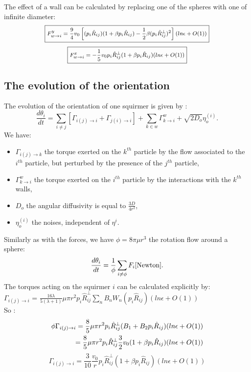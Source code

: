 \documentclass{article}
\begin{document}
The effect of a wall can be calculated by replacing one of the spheres with one of infinite diameter:
\begin{equation*}
    \footnotesize
    \boxed{F_{w\rightarrow i}^{y} = \frac{9}{4} v_0
    \left[(p_i\hat{R}_{ij})(1 + \beta p_i\hat{R}_{ij}) - \frac{1}{2}\beta(p_i\hat{R}^{\perp}_{ij})^2\right](ln \epsilon + O(1))}\\
\end{equation*}
\begin{equation*}
    \footnotesize
    \boxed{F_{w\rightarrow i}^{x} = -\frac{1}{5} v_0p_i\hat{R}^{\perp}_{ij}(1 + \beta p_i\hat{R}_{ij})(ln \epsilon + O(1))}
\end{equation*}

\subsection{The evolution of the orientation}
The evolution of the orientation of one squirmer is given by : 
$$
\boxed{\frac{d \theta_i}{dt} = \sum\limits_{i\ne j} \left[\Gamma_{i(j)\rightarrow i} + \Gamma_{j(i)\rightarrow i}\right] + \sum\limits_{k\in w} \Gamma_{k\rightarrow i}^w + \sqrt{2D_o} \eta_o^{(i)}}.
$$
We have:
\begin{itemize}
    \item $\Gamma_{i(j)\rightarrow k}$ the torque exerted on the $k^{th}$ particle by the flow associated to the $i^{th}$ particle, but perturbed by the presence of the $j^{th}$ particle,
    \item $\Gamma_{k\rightarrow i}^w$ the torque exerted on the $i^{th}$ particle by the interactions with the $k^{th}$ walls,
    \item $D_o$ the angular diffusivity is equal to $\frac{3D}{4r^2}$,
    \item $\eta_o^{(i)}$ the noises, independent of $\eta^{i}$.
\end{itemize}
\vspace{0.5cm}
Similarly as with the forces, we have $\phi = 8\pi\mu r^3$ the rotation flow around a sphere\cite{Stokes}:
$$\frac{d \theta_i}{dt} = \frac{1}{\phi}\sum\limits_{i \ne \phi}F_i\cite{Newton}.$$
The torques acting on the squirmer $i$ can be calculated explicitly by: \\
$\Gamma_{i(j)\rightarrow i}$ = $\frac{16 \lambda}{5(\lambda +1)} \mu \pi r^2 p_i\hat{R}_{ij}^{\perp}\sum_{n} B_n W_n(p_i\hat{R}_{ij}) (ln \epsilon + O(1))$ \cite{Brumley}
\\ So :
\begin{align*}
    \footnotesize
    \phi \Gamma_{i(j)\rightarrow i} = \frac{8}{5}\mu\pi r^2p_i\hat{R}_{ij}^{\perp}(B_1 + B_2 p_i\hat{R}_{ij})(ln \epsilon + O(1))\\
    = \frac{8}{5}\mu\pi r^2p_i\hat{R}_{ij}^{\perp}\frac{3}{2}v_0(1 + \beta p_i\hat{R}_{ij})(ln \epsilon + O(1))
\end{align*}
\begin{equation*}
    \boxed{\Gamma_{i(j)\rightarrow i} = \frac{3}{10}\frac{v_0}{r}p_i\hat{R}_{ij}^{\perp}(1 + \beta p_i\hat{R}_{ij})(ln \epsilon + O(1))}
\end{equation*}
\end{document}
